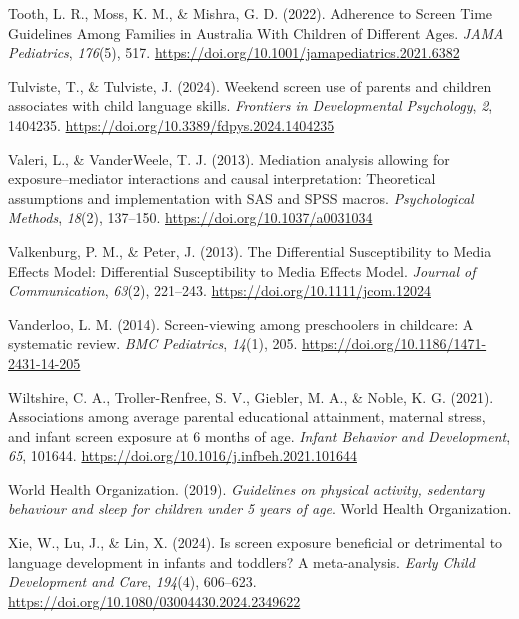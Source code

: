 \documentclass[
  man,
  floatsintext,
  longtable,
  nolmodern,
  notxfonts,
  notimes,
  colorlinks=true,linkcolor=blue,citecolor=blue,urlcolor=blue]{apa7}
\newlength{\cslhangindent}
\newenvironment{CSLReferences}[2] %
 {\begin{list}{}{%
  \setlength{\itemindent}{0pt}
  \setlength{\leftmargin}{0pt}
  \setlength{\parsep}{0pt}
  \ifodd #1
   \setlength{\leftmargin}{\cslhangindent}
   \setlength{\itemindent}{-1\cslhangindent}
  \fi
  \setlength{\itemsep}{#2\baselineskip}}}
 {\end{list}}
\begin{document}
\begin{CSLReferences}{1}{0}
Tooth, L. R., Moss, K. M., \& Mishra, G. D. (2022). Adherence to {Screen
Time Guidelines Among Families} in {Australia With Children} of
{Different Ages}. \emph{JAMA Pediatrics}, \emph{176}(5), 517.
\url{https://doi.org/10.1001/jamapediatrics.2021.6382}

Tulviste, T., \& Tulviste, J. (2024). Weekend screen use of parents and
children associates with child language skills. \emph{Frontiers in
Developmental Psychology}, \emph{2}, 1404235.
\url{https://doi.org/10.3389/fdpys.2024.1404235}

Valeri, L., \& VanderWeele, T. J. (2013). Mediation analysis allowing
for exposure--mediator interactions and causal interpretation:
{Theoretical} assumptions and implementation with {SAS} and {SPSS}
macros. \emph{Psychological Methods}, \emph{18}(2), 137--150.
\url{https://doi.org/10.1037/a0031034}

Valkenburg, P. M., \& Peter, J. (2013). The {Differential
Susceptibility} to {Media Effects Model}: {Differential Susceptibility}
to {Media Effects Model}. \emph{Journal of Communication}, \emph{63}(2),
221--243. \url{https://doi.org/10.1111/jcom.12024}

Vanderloo, L. M. (2014). Screen-viewing among preschoolers in childcare:
A systematic review. \emph{BMC Pediatrics}, \emph{14}(1), 205.
\url{https://doi.org/10.1186/1471-2431-14-205}

Wiltshire, C. A., Troller-Renfree, S. V., Giebler, M. A., \& Noble, K.
G. (2021). Associations among average parental educational attainment,
maternal stress, and infant screen exposure at 6 months of age.
\emph{Infant Behavior and Development}, \emph{65}, 101644.
\url{https://doi.org/10.1016/j.infbeh.2021.101644}

World Health Organization. (2019). \emph{Guidelines on physical
activity, sedentary behaviour and sleep for children under 5 years of
age}. World Health Organization.

Xie, W., Lu, J., \& Lin, X. (2024). Is screen exposure beneficial or
detrimental to language development in infants and toddlers? {A}
meta-analysis. \emph{Early Child Development and Care}, \emph{194}(4),
606--623. \url{https://doi.org/10.1080/03004430.2024.2349622}


\end{CSLReferences}
\end{document}
